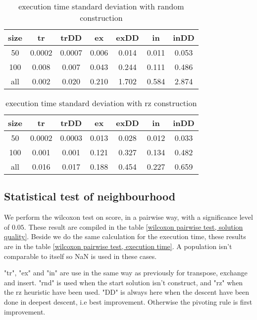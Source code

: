 \documentclass[12pt,a4paper]{article}
\begin{document}
\begin{table}[!h]
\centering
\begin{tabular}{|*{7}{c|}}
  \hline
  size & tr & trDD & ex & exDD & in & inDD \\
  \hline
  50 & 0.0002 & 0.0007 & 0.006 & 0.014 & 0.011 & 0.053 \\ %
  100 & 0.008 & 0.007 & 0.043 & 0.244 & 0.111 & 0.486 \\ %
  all & 0.002 & 0.020 & 0.210 & 1.702 & 0.584 & 2.874 \\ %
  \hline
\end{tabular}
\caption{execution time standard deviation with random construction}
\label{Execution time with random construction sd}
\end{table}


\begin{table}[!h]
\centering
\begin{tabular}{|*{7}{c|}}
  \hline
  size & tr & trDD & ex & exDD & in & inDD \\
  \hline
  50 & 0.0002 & 0.0003 & 0.013 & 0.028 & 0.012 & 0.033 \\ %
  100 & 0.001 & 0.001 & 0.121 & 0.327 & 0.134 & 0.482 \\ %
  all & 0.016 & 0.017 & 0.188 & 0.454 & 0.227 & 0.659 \\%
  \hline
\end{tabular}
\caption{execution time standard deviation with rz construction}
\label{Execution time with rz construction sd}
\end{table}


\subsection{Statistical test of neighbourhood}

We perform the wilcoxon test on score, in a pairwise way, with a significance level of $0.05$. These result are compiled in the table \ref{wilcoxon pairwise test, solution quality}. Beside we do the same calculation for the execution time, these results are in the table \ref{wilcoxon pairwise test, execution time}. A population isn't comparable to itself so NaN is used in these cases.

"tr", "ex" and "in" are use in the same way as previously for transpose, exchange and insert. "rnd" is used when the start solution isn't construct, and "rz" when the rz heuristic have been used. "DD" is always here when the descent have been done in deepest descent, i.e best improvement. Otherwise the pivoting rule is first improvement.
\end{document}
